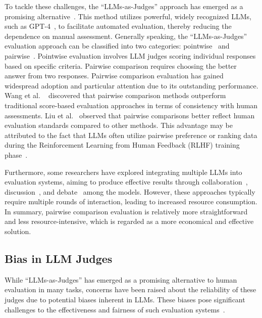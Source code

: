 \documentclass[sigconf]{acmart}
\begin{document}
To tackle these challenges, the ``LLMs-as-Judges'' approach has emerged as a promising alternative~\cite{ye2024justice}. This method utilizes powerful, widely recognized LLMs, such as GPT-4~\cite{openai2023gpt4}, to facilitate automated evaluation, thereby reducing the dependence on manual assessment.
Generally speaking, the ``LLMs-as-Judges'' evaluation approach can be classified into two categories: pointwise~\cite{kim2023prometheus} and pairwise~\cite{lambert2024rewardbench,zhu2023judgelm}. Pointwise evaluation involves LLM judges scoring individual responses based on specific criteria. Pairwise comparison requires choosing the better answer from two responses.
Pairwise comparison evaluation has gained widespread adoption and particular attention due to its outstanding performance.
Wang et al. ~\cite{wang2023largelanguagemodelsfair} discovered that pairwise comparison methods outperform traditional score-based evaluation approaches in terms of consistency with human assessments. Liu et al.~\cite{liu2024aligning} observed that pairwise comparisons better reflect human evaluation standards compared to other methods. This advantage may be attributed to the fact that LLMs often utilize pairwise preference or ranking data during the Reinforcement Learning from Human Feedback (RLHF) training phase~\cite{dong2024unsupervisedlargelanguagemodel}.

Furthermore, some researchers have explored integrating multiple LLMs into evaluation systems, aiming to produce effective results through collaboration~\cite{chan2023chateval}, discussion~\cite{li2023prd}, and debate~\cite{chu2024prepeerreviewbased} among the models. However, these approaches typically require multiple rounds of interaction, leading to increased resource consumption. 
In summary, pairwise comparison evaluation is relatively more straightforward and less resource-intensive, which is regarded as a more economical and effective solution.



\subsection{Bias in LLM Judges}
While ``LLMs-as-Judges'' has emerged as a promising alternative to human evaluation in many tasks, concerns have been raised about the reliability of these judges due to potential biases inherent in LLMs. 
These biases pose significant challenges to the effectiveness and fairness of such evaluation systems~\cite{shi2024judging,zhou2024mitigating}.
\end{document}
